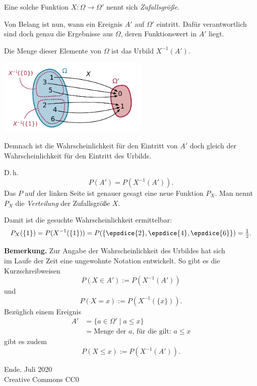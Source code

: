 \documentclass[9pt]{beamer}
\newcommand{\modest}[1]{{\small\color{gray}#1}}
\newcommand{\strong}[1]{\textsf{\textbf{#1}}}
\newcommand{\parspace}{\vspace{0.8em}}
\newcommand\dice[1]{\vcenter{\hbox{\epsdice{#1}}}}
\begin{document}
\begin{frame}[t]
\vspace{3em}
Eine solche Funktion $X\colon\Omega\to\Omega'$ nennt sich
\emph{Zufallsgröße}.\pause

\parspace
Von Belang ist nun, wann ein Ereignis $A'$ auf $\Omega'$ eintritt.
Dafür verantwortlich sind doch genau die Ergebnisse aus $\Omega$,
deren Funktionswert in $A'$ liegt.\pause

\parspace
Die Menge dieser Elemente von $\Omega$ ist das Urbild $X^{-1}(A')$.\pause

\begin{center}
\includegraphics[width=72mm]{img/preimage.pdf}
\end{center}
\end{frame}

\begin{frame}
Demnach ist die Wahrscheinlichkeit für den Eintritt von $A'$ doch
gleich der Wahrscheinlichkeit für den Eintritt des Urbilds.\pause

\parspace
D.\,h.
\[P(A') = P(X^{-1}(A')).\]\pause
Das $P$ auf der linken Seite ist genauer gesagt eine neue Funktion $P_X$.
Man nennt $P_X$ die \emph{Verteilung} der Zufallsgröße $X$.
\end{frame}

\begin{frame}
Damit ist die gesuchte Wahrscheinlichkeit ermittelbar:
\[P_X(\{1\}) = P(X^{-1}(\{1\})) = P(\{\dice{2},\dice{4},\dice{6}\})
 = \tfrac{1}{2}.\]
\end{frame}

\begin{frame}
\strong{Bemerkung.} Zur Angabe der Wahrscheinlichkeit des Urbildes hat
sich\\
im Laufe der Zeit eine ungewohnte Notation entwickelt. So gibt es
die Kurzschreibweisen
\[P(X\in A') := P(X^{-1}(A'))\]
und
\[P(X=x) := P(X^{-1}(\{x\})).\]\pause
Bezüglich einem Ereignis
\begin{align*}A' &= \{a\in\Omega'\mid a\le x\}\\
&= \text{Menge der $a$, für die gilt: $a\le x$}
\end{align*}
gibt es zudem
\[P(X\le x) := P(X^{-1}(A')).\]
\end{frame}

\begin{frame}
Ende.
\vfill\hfill\modest{Juli 2020}\\
\hfill\modest{Creative Commons CC0}
\end{frame}
\end{document}
